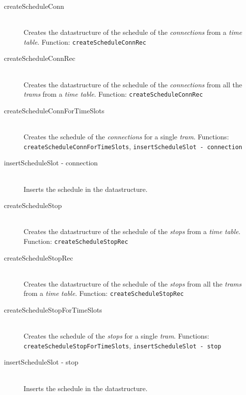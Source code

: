 \documentclass[a4]{article}
\begin{document}
\begin{description}
    \item[createScheduleConn] \hfill \\ Creates the datastructure of the schedule of the \emph{connections} from a \emph{time table}. Function: \verb=createScheduleConnRec=
    \item[createScheduleConnRec] \hfill \\ Creates the datastructure of the schedule of the \emph{connections} from all the \emph{trams} from a \emph{time table}. Function: \verb=createScheduleConnRec=
    \item[createScheduleConnForTimeSlots] \hfill \\ Creates the schedule of the \emph{connections} for a single \emph{tram}. Functions: \verb=createScheduleConnForTimeSlots=, \verb=insertScheduleSlot - connection=
    \item[insertScheduleSlot - connection] \hfill \\ Inserts the schedule in the datastructure.
    \item[createScheduleStop] \hfill \\ Creates the datastructure of the schedule of the \emph{stops} from a \emph{time table}. Function: \verb=createScheduleStopRec=
    \item[createScheduleStopRec] \hfill \\ Creates the datastructure of the schedule of the \emph{stops} from all the \emph{trams} from a \emph{time table}. Function: \verb=createScheduleStopRec=
    \item[createScheduleStopForTimeSlots] \hfill \\ Creates the schedule of the \emph{stops} for a single \emph{tram}. Functions: \verb=createScheduleStopForTimeSlots=, \verb=insertScheduleSlot - stop=
    \item[insertScheduleSlot - stop] \hfill \\ Inserts the schedule in the datastructure.
\end{description}
\end{document}
